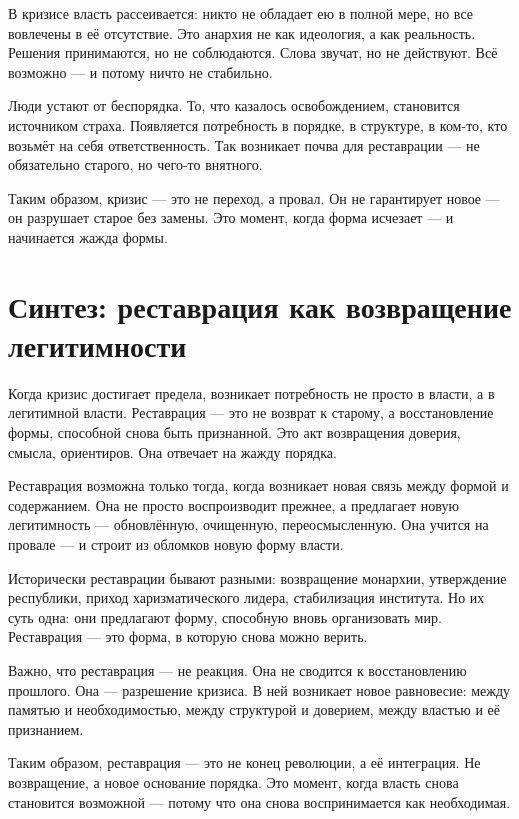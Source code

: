 В кризисе власть рассеивается: никто не обладает ею в полной мере, но все вовлечены в её отсутствие. Это анархия не как идеология, а как реальность. Решения принимаются, но не соблюдаются. Слова звучат, но не действуют. Всё возможно — и потому ничто не стабильно.

Люди устают от беспорядка. То, что казалось освобождением, становится источником страха. Появляется потребность в порядке, в структуре, в ком-то, кто возьмёт на себя ответственность. Так возникает почва для реставрации — не обязательно старого, но чего-то внятного.

Таким образом, кризис — это не переход, а провал. Он не гарантирует новое — он разрушает старое без замены. Это момент, когда форма исчезает — и начинается жажда формы.

\section{Синтез: реставрация как возвращение легитимности}

Когда кризис достигает предела, возникает потребность не просто в власти, а в легитимной власти. Реставрация — это не возврат к старому, а восстановление формы, способной снова быть признанной. Это акт возвращения доверия, смысла, ориентиров. Она отвечает на жажду порядка.

Реставрация возможна только тогда, когда возникает новая связь между формой и содержанием. Она не просто воспроизводит прежнее, а предлагает новую легитимность — обновлённую, очищенную, переосмысленную. Она учится на провале — и строит из обломков новую форму власти.

Исторически реставрации бывают разными: возвращение монархии, утверждение республики, приход харизматического лидера, стабилизация института. Но их суть одна: они предлагают форму, способную вновь организовать мир. Реставрация — это форма, в которую снова можно верить.

Важно, что реставрация — не реакция. Она не сводится к восстановлению прошлого. Она — разрешение кризиса. В ней возникает новое равновесие: между памятью и необходимостью, между структурой и доверием, между властью и её признанием.

Таким образом, реставрация — это не конец революции, а её интеграция. Не возвращение, а новое основание порядка. Это момент, когда власть снова становится возможной — потому что она снова воспринимается как необходимая.

